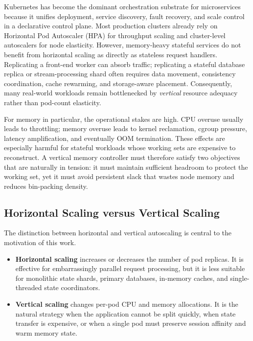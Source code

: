\documentclass[12pt,a4paper]{article}
\begin{document}
Kubernetes has become the dominant orchestration substrate for microservices because it unifies deployment, service discovery, fault recovery, and scale control in a declarative control plane. Most production clusters already rely on Horizontal Pod Autoscaler (HPA) for throughput scaling and cluster-level autoscalers for node elasticity. However, memory-heavy stateful services do not benefit from horizontal scaling as directly as stateless request handlers. Replicating a front-end worker can absorb traffic; replicating a stateful database replica or stream-processing shard often requires data movement, consistency coordination, cache rewarming, and storage-aware placement. Consequently, many real-world workloads remain bottlenecked by \emph{vertical} resource adequacy rather than pod-count elasticity.

For memory in particular, the operational stakes are high. CPU overuse usually leads to throttling; memory overuse leads to kernel reclamation, cgroup pressure, latency amplification, and eventually OOM termination. These effects are especially harmful for stateful workloads whose working sets are expensive to reconstruct. A vertical memory controller must therefore satisfy two objectives that are naturally in tension: it must maintain sufficient headroom to protect the working set, yet it must avoid persistent slack that wastes node memory and reduces bin-packing density.

\subsection{Horizontal Scaling versus Vertical Scaling}

The distinction between horizontal and vertical autoscaling is central to the motivation of this work.
\begin{itemize}
    \item \textbf{Horizontal scaling} increases or decreases the number of pod replicas. It is effective for embarrassingly parallel request processing, but it is less suitable for monolithic state shards, primary databases, in-memory caches, and single-threaded state coordinators.
    \item \textbf{Vertical scaling} changes per-pod CPU and memory allocations. It is the natural strategy when the application cannot be split quickly, when state transfer is expensive, or when a single pod must preserve session affinity and warm memory state.
\end{itemize}
\end{document}
